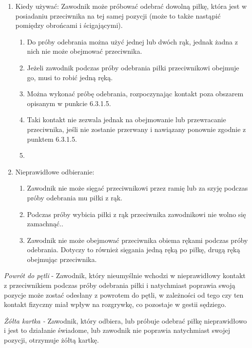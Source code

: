 \documentclass[12pt]{article}
\begin{document}
\begin{enumerate}
\item
    Kiedy używać: Zawodnik może próbować odebrać dowolną piłkę, która jest
  w posiadaniu przeciwnika na tej samej pozycji (może to także nastąpić
  pomiędzy obrońcami i ścigającymi).
  
  \begin{enumerate}
  \item
        Do próby odebrania można użyć jednej lub dwóch rąk, jednak żadna z
    nich nie może obejmować przeciwnika.
      \item
        Jeżeli zawodnik podczas próby odebrania piłki przeciwnikowi obejmuje
    go, musi to robić jedną ręką.
      \item
        Można wykonać próbę odebrania, rozpoczynając kontakt poza obszarem
    opisanym w punkcie 6.3.1.5.\item Taki kontakt nie zezwala jednak na
    obejmowanie lub przewracanie przeciwnika, jeśli nie zostanie
    przerwany i nawiązany ponownie zgodnie z punktem 6.3.1.5.\item
      \end{enumerate}
\item
    Nieprawidłowe odbieranie:
  
  \begin{enumerate}
  \item
        Zawodnik nie może sięgać przeciwnikowi przez ramię lub za szyję
    podczas próby odebrania mu piłki z rąk.
      \item
        Podczas próby wybicia piłki z rąk przeciwnika zawodnikowi nie wolno
    się zamachnąć..
      \item
        Zawodnik nie może obejmować przeciwnika obiema rękami podczas próby
    odebrania. Dotyczy to również sięgania jedną ręką po piłkę, drugą
    ręką obejmując przeciwnika.
      \end{enumerate}
\end{enumerate}

\emph{Powrót do pętli} - Zawodnik, który nieumyślnie wchodzi w
nieprawidłowy kontakt z przeciwnikiem podczas próby odebrania piłki i
natychmiast poprawia swoją pozycje może zostać odesłany z powrotem do
pętli, w zależności od tego czy ten kontakt fizyczny miał wpływ na
rozgrywkę, co pozostaje w gestii sędziego.

\emph{Żółta kartka -} Zawodnik, który odbiera, lub próbuje odebrać piłkę
nieprawidłowo i jest to działanie świadome, lub zawodnik nie poprawia
natychmiast swojej pozycji, otrzymuje żółtą kartkę.
\end{document}

